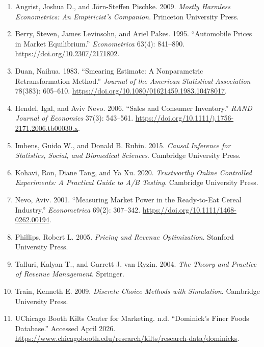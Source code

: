 \documentclass[UTF8,11pt,a4paper,fontset=none]{ctexart}
\begin{document}
\begin{enumerate}
  \item Angrist, Joshua D., and Jörn-Steffen Pischke. 2009. \textit{Mostly Harmless Econometrics: An Empiricist's Companion}. Princeton University Press.
  \item Berry, Steven, James Levinsohn, and Ariel Pakes. 1995. ``Automobile Prices in Market Equilibrium.'' \textit{Econometrica} 63(4): 841--890. \url{https://doi.org/10.2307/2171802}.
  \item Duan, Naihua. 1983. ``Smearing Estimate: A Nonparametric Retransformation Method.'' \textit{Journal of the American Statistical Association} 78(383): 605--610. \url{https://doi.org/10.1080/01621459.1983.10478017}.
  \item Hendel, Igal, and Aviv Nevo. 2006. ``Sales and Consumer Inventory.'' \textit{RAND Journal of Economics} 37(3): 543--561. \url{https://doi.org/10.1111/j.1756-2171.2006.tb00030.x}.
  \item Imbens, Guido W., and Donald B. Rubin. 2015. \textit{Causal Inference for Statistics, Social, and Biomedical Sciences}. Cambridge University Press.
  \item Kohavi, Ron, Diane Tang, and Ya Xu. 2020. \textit{Trustworthy Online Controlled Experiments: A Practical Guide to A/B Testing}. Cambridge University Press.
  \item Nevo, Aviv. 2001. ``Measuring Market Power in the Ready-to-Eat Cereal Industry.'' \textit{Econometrica} 69(2): 307--342. \url{https://doi.org/10.1111/1468-0262.00194}.
  \item Phillips, Robert L. 2005. \textit{Pricing and Revenue Optimization}. Stanford University Press.
  \item Talluri, Kalyan T., and Garrett J. van Ryzin. 2004. \textit{The Theory and Practice of Revenue Management}. Springer.
  \item Train, Kenneth E. 2009. \textit{Discrete Choice Methods with Simulation}. Cambridge University Press.
  \item UChicago Booth Kilts Center for Marketing. n.d. ``Dominick's Finer Foods Database.'' Accessed April 2026. \url{https://www.chicagobooth.edu/research/kilts/research-data/dominicks}.
\end{enumerate}
\end{document}
